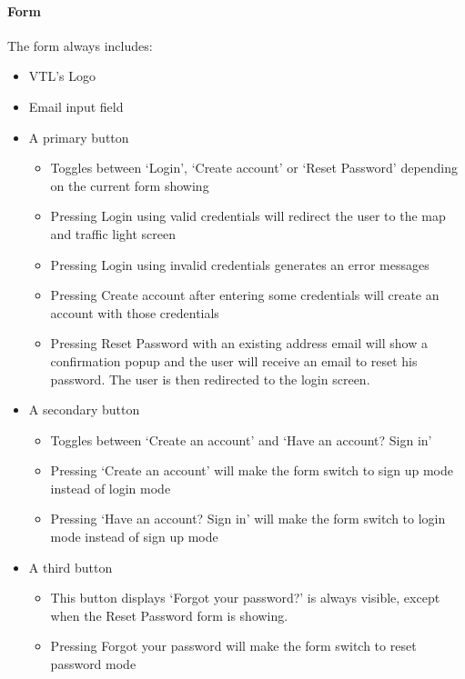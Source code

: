 \documentclass[letterpaper,10pt,english]{sphinxmanual}
\begin{document}
\paragraph{Form}
\label{\detokenize{microservices/driver_app/screens:form}}
The form always includes:
\begin{itemize}
\item {} 
VTL’s Logo

\item {} 
Email input field

\item {} 
A primary button
\begin{itemize}
\item {} 
Toggles between ‘Login’, ‘Create account’ or ‘Reset Password’ depending on the current form showing

\item {} 
Pressing Login using valid credentials will redirect the user to the map and traffic light screen

\item {} 
Pressing Login using invalid credentials generates an error messages

\item {} 
Pressing Create account after entering some credentials will create an account with those credentials

\item {} 
Pressing Reset Password with an existing address email will show a confirmation popup and the user will receive an email to reset his password. The user is then redirected to the login screen.

\end{itemize}

\item {} 
A secondary button
\begin{itemize}
\item {} 
Toggles between ‘Create an account’ and  ‘Have an account? Sign in’

\item {} 
Pressing ‘Create an account’ will make the form switch to sign up mode instead of login mode

\item {} 
Pressing ‘Have an account? Sign in’ will make the form switch to login mode instead of sign up mode

\end{itemize}

\item {} 
A third button
\begin{itemize}
\item {} 
This button displays ‘Forgot your password?’ is always visible, except when the Reset Password form is showing.

\item {} 
Pressing Forgot your password will make the form switch to reset password mode

\end{itemize}

\end{itemize}
\end{document}
